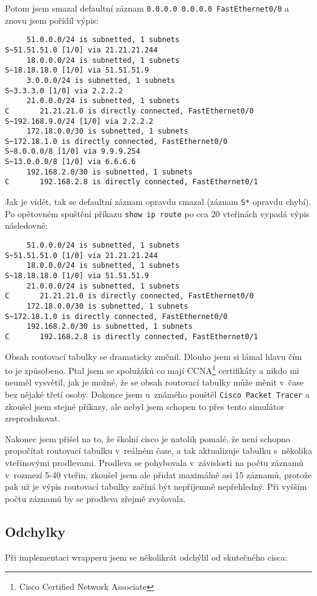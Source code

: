 Potom jsem smazal defaultní záznam \verb|0.0.0.0 0.0.0.0 FastEthernet0/0| a znovu jsem pořídíl výpis:
\begin{verbatim}
     51.0.0.0/24 is subnetted, 1 subnets
S~51.51.51.0 [1/0] via 21.21.21.244
     18.0.0.0/24 is subnetted, 1 subnets
S~18.18.18.0 [1/0] via 51.51.51.9
     3.0.0.0/24 is subnetted, 1 subnets
S~3.3.3.0 [1/0] via 2.2.2.2
     21.0.0.0/24 is subnetted, 1 subnets
C       21.21.21.0 is directly connected, FastEthernet0/0
S~192.168.9.0/24 [1/0] via 2.2.2.2
     172.18.0.0/30 is subnetted, 1 subnets
S~172.18.1.0 is directly connected, FastEthernet0/0
S~8.0.0.0/8 [1/0] via 9.9.9.254
S~13.0.0.0/8 [1/0] via 6.6.6.6
     192.168.2.0/30 is subnetted, 1 subnets
C       192.168.2.8 is directly connected, FastEthernet0/1
\end{verbatim} 
Jak je vidět, tak se defaultní záznam opravdu smazal (záznam \verb|S*| opravdu chybí). Po opětovném spuštění příkazu \verb|show ip route| po cca 20 vteřinách vypadá výpis následovně:
\begin{verbatim}
     51.0.0.0/24 is subnetted, 1 subnets
S~51.51.51.0 [1/0] via 21.21.21.244
     18.0.0.0/24 is subnetted, 1 subnets
S~18.18.18.0 [1/0] via 51.51.51.9
     21.0.0.0/24 is subnetted, 1 subnets
C       21.21.21.0 is directly connected, FastEthernet0/0
     172.18.0.0/30 is subnetted, 1 subnets
S~172.18.1.0 is directly connected, FastEthernet0/0
     192.168.2.0/30 is subnetted, 1 subnets
C       192.168.2.8 is directly connected, FastEthernet0/1
\end{verbatim} 

Obsah routovací tabulky se dramaticky změnil. Dlouho jsem si lámal hlavu čím to je způsobeno. Ptal jsem se spolužáků co mají CCNA\footnote{Cisco Certified Network Associate} certifikáty a nikdo mi neuměl vysvětil, jak je možné, že se obsah routovací tabulky může měnit v~čase bez nějaké třetí osoby. Dokonce jsem u~známého pouštěl \verb|Cisco Packet Tracer| a zkoušel jsem stejné příkazy, ale nebyl jsem schopen to přes tento simulátor zreprodukovat.

Nakonec jsem přišel na to, že školní cisco je natolik pomalé, že není schopno propočítat routovací tabulku v~reálném čase, a tak aktualizuje tabulku s~několika vteřinovými prodlevami. Prodleva se pohybovala v~závislosti na počtu záznamů v~rozmezí 5-40 vteřin, zkoušel jsem ale přidat maximálně asi 15 záznamů, protože pak už je výpis routovací tabulky začíná být nepříjemně nepřehledný. Při vyšším počtu záznamů by se prodleva zřejmě zvyšovala. 

\subsection{Odchylky}
Při implementaci wrapperu jsem se několikrát odchýlil od skutečného cisca:


